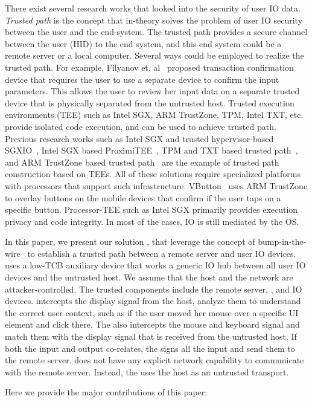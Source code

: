 There exist several research works that looked into the security of user IO data. \emph{Trusted path} is the concept that in-theory solves the problem of user IO security between the user and the end-system. The trusted path provides a secure channel between the user (HID) to the end system, and this end system could be a remote server or a local computer. Several ways could be employed to realize the trusted path. For example, Filyanov et. al~\cite{filyanov2011uni} proposed transaction confirmation device that requires the user to use a separate device to confirm the input parameters. This allows the user to review her input data on a separate trusted device that is physically separated from the untrusted host. Trusted execution environments (TEE) such as Intel SGX, ARM TrustZone, TPM, Intel TXT, etc. provide isolated code execution, and can be used to achieve trusted path. Previous research works such as Intel SGX and trusted hypervisor-based SGXIO~\cite{weiser2017sgxio}, Intel SGX based ProximiTEE~\cite{dhar2018proximitee}, TPM and TXT based trusted path~\cite{filyanov2011uni}, and ARM TrustZone based trusted path~\cite{filyanov2011uni,sun2015trustotp} are the example of trusted path construction based on TEEs. All of these solutions require specialized platforms with processors that support such infrastructure. VButton~\cite{li2018vbutton} uses ARM TrustZone to overlay buttons on the mobile devices that confirm if the user taps on a specific button. Processor-TEE such as Intel SGX primarily provides execution privacy and code integrity. In most of the cases, IO is still mediated by the OS. 


 In this paper, we present our solution \name, that leverage the concept of bump-in-the-wire~\cite{McCPerRei2006} to establish a trusted path between a remote server and user IO devices. \name uses a low-TCB auxiliary device that works a generic IO hub between all user IO devices and the untrusted host. 
We assume that the host and the network are attacker-controlled. The trusted components include the remote server, \device, and IO devices. \device intercepts the display signal from the host, analyze them to understand the correct user context, such as if the user moved her mouse over a specific UI element and click there. The \device also intercepts the mouse and keyboard signal and match them with the display signal that is received from the untrusted host. If both the input and output co-relates, the \device signs all the input and send them to the remote server. \device does not have any explicit network capability to communicate with the remote server. Instead, the \device uses the host as an untrusted transport.

 Here we provide the major contributions of this paper:
\begin{mylist}
  \item
\end{mylist}

